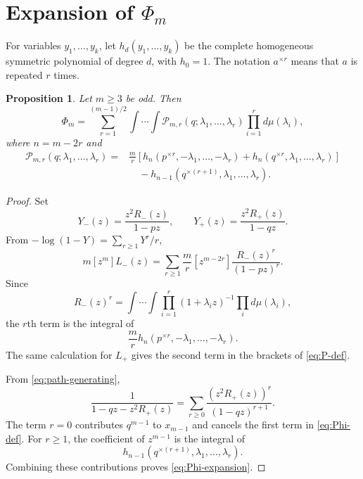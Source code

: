 \documentclass[11pt]{article}
\numberwithin{equation}{section}
\newtheorem{proposition}[theorem]{Proposition}
\newcommand{\Pcal}{\mathcal P}
\begin{document}
\section{Expansion of \texorpdfstring{$\Phi_m$}{Phi m}}

For variables $y_1,\ldots,y_k$, let $h_d(y_1,\ldots,y_k)$ be the complete homogeneous symmetric polynomial of degree $d$, with $h_0=1$. The notation $a^{\times r}$ means that $a$ is repeated $r$ times.

\begin{proposition}\label{prop:expansion}
Let $m\ge3$ be odd. Then
\begin{equation}\label{eq:Phi-expansion}
 \Phi_m=
 \sum_{r=1}^{(m-1)/2}
 \int\cdots\int
 \Pcal_{m,r}(q;\lambda_1,\ldots,\lambda_r)
 \prod_{i=1}^r d\mu(\lambda_i),
\end{equation}
where $n=m-2r$ and
\begin{equation}\label{eq:P-def}
\begin{aligned}
 \Pcal_{m,r}(q;\lambda_1,\ldots,\lambda_r)
 ={}&\frac mr\left[
 h_n(p^{\times r},-\lambda_1,\ldots,-\lambda_r)
 +h_n(q^{\times r},\lambda_1,\ldots,\lambda_r)
 \right]\\
 &\quad-h_{n-1}(q^{\times(r+1)},\lambda_1,\ldots,\lambda_r).
\end{aligned}
\end{equation}
\end{proposition}

\begin{proof}
Set
\[
        Y_-(z)=\frac{z^2R_-(z)}{1-pz},
        \qquad
        Y_+(z)=\frac{z^2R_+(z)}{1-qz}.
\]
From $-\log(1-Y)=\sum_{r\ge1}Y^r/r$,
\[
 m[z^m]L_-(z)
 =\sum_{r\ge1}\frac mr[z^{m-2r}]
   \frac{R_-(z)^r}{(1-pz)^r}.
\]
Since
\[
 R_-(z)^r
 =\int\cdots\int\prod_{i=1}^r(1+\lambda_i z)^{-1}
   \prod_i d\mu(\lambda_i),
\]
the $r$th term is the integral of
\[
        \frac mr h_n(p^{\times r},-\lambda_1,\ldots,-\lambda_r).
\]
The same calculation for $L_+$ gives the second term in the brackets of \eqref{eq:P-def}.

From \eqref{eq:path-generating},
\[
 \frac1{1-qz-z^2R_+(z)}
 =\sum_{r\ge0}\frac{(z^2R_+(z))^r}{(1-qz)^{r+1}}.
\]
The term $r=0$ contributes $q^{m-1}$ to $x_{m-1}$ and cancels the first term in \eqref{eq:Phi-def}. For $r\ge1$, the coefficient of $z^{m-1}$ is the integral of
\[
        h_{n-1}(q^{\times(r+1)},\lambda_1,\ldots,\lambda_r).
\]
Combining these contributions proves \eqref{eq:Phi-expansion}.
\end{proof}
\end{document}
